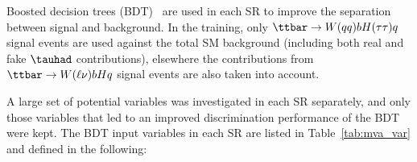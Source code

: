 Boosted decision trees (BDT)~\cite{Breiman:1984jka,Friedman:2002we,Freund:1997xna} are used in each SR to improve the separation between signal and background. 
In the training, only $\ttbar \to W(qq)bH(\tau\tau)q$ signal events are used against the total SM background (including both real and fake $\tauhad$ contributions), 
elsewhere the contributions from $\ttbar \to W(\ell\nu)bHq$ signal events are also taken into account. 

A large set of potential variables was investigated in each SR separately, and only those variables that led to an improved discrimination
performance of the BDT were kept.  The BDT input variables in each SR are listed in Table~\ref{tab:mva_var} and defined in the following:

